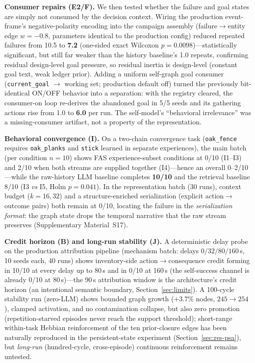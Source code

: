\documentclass[10pt]{article}
\begin{document}
\textbf{Consumer repairs (E2/F).} We then tested whether the failure
and goal states are simply not consumed by the decision context.
Wiring the production event-frame's negative-polarity encoding into
the campaign assembly (failure$\rightarrow$entity edge $w{=}{-}0.8$,
parameters identical to the production config) reduced repeated
failures from 10.5 to \textbf{7.2} (one-sided exact Wilcoxon
$p{=}0.0098$)---statistically significant, but still far weaker than the history baseline's 1.0 repeats, confirming residual design-level goal pressure,
so residual inertia is design-level (constant goal text, weak ledger
prior). Adding a uniform self-graph goal consumer
(\texttt{current\_goal} $\rightarrow$ working set; production default
off) turned the previously bit-identical ON/OFF behavior into a
separation: with the registry cleared, the consumer-on loop re-derives
the abandoned goal in 5/5 seeds and its gathering actions rise from
1.0 to \textbf{6.0} per run. The self-model's ``behavioral
irrelevance'' was a missing-consumer artifact, not a property of the
representation.

\textbf{Behavioral convergence (I).} On a two-chain convergence task
(\texttt{oak\_fence} requires \texttt{oak\_planks} and \texttt{stick}
learned in separate experiences), the main batch (per condition
$n{=}10$) shows FAS experience-subset conditions at 0/10 (I1--I3) and
2/10 when both streams are supplied together (I4)---hence an overall
0--2/10---while the raw-history LLM baseline completes \textbf{10/10}
and the retrieval baseline 8/10 (I3 \emph{vs} I5, Holm $p{=}0.041$).
In the representation batch (30 runs), context budget ($k{=}16,32$)
and a structure-enriched serialization (explicit
action$\rightarrow$outcome pairs) both remain at 0/10, locating the
failure in the \emph{serialization format}: the graph state drops the
temporal narrative that the raw stream preserves (Supplementary
Material~S17).

\textbf{Credit horizon (B) and long-run stability (J).} A deterministic
delay probe on the production attribution pipeline (mechanism batch:
delays $0/32/80/160$\,s, 10 seeds each, 40 runs) shows inventory-side
action$\rightarrow$consequence credit forming in 10/10 at every delay
up to 80\,s and in 0/10 at 160\,s (the self-success channel is already
0/10 at 80\,s)---the 90\,s attribution window is the
architecture's credit horizon (an intentional semantic boundary,
Section~\ref{sec:limits}). A 100-cycle stability run (zero-LLM) shows
bounded graph growth ($+3.7\%$ nodes, $245{\rightarrow}254$), clamped
activation, and no contamination collapse, but also zero promotion
(repetition-starved episodes never reach the support threshold);
short-range within-task Hebbian reinforcement of the ten prior-closure
edges has been naturally reproduced in the persistent-state experiment
(Section~\ref{sec:res-psa}), but \emph{long-run} (hundred-cycle,
cross-episode) continuous reinforcement remains untested.
\end{document}
